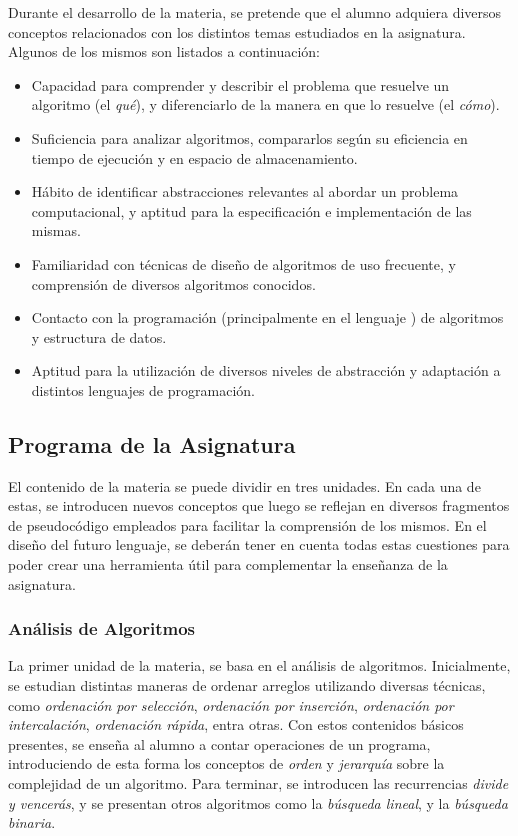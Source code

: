 Durante el desarrollo de la materia, se pretende que el alumno adquiera diversos conceptos relacionados con los distintos temas estudiados en la asignatura.
Algunos de los mismos son listados a continuación:
\begin{itemize}
    \item Capacidad para comprender y describir el problema que resuelve un algoritmo (el \textit{qué}), y diferenciarlo de la manera en que lo resuelve (el \textit{cómo}).
    \item Suficiencia para analizar algoritmos, compararlos según su eficiencia en tiempo de ejecución y en espacio de almacenamiento.
    \item Hábito de identificar abstracciones relevantes al abordar un problema computacional, y aptitud para la especificación e implementación de las mismas.
    \item Familiaridad con técnicas de diseño de algoritmos de uso frecuente, y comprensión de diversos algoritmos conocidos.
    \item Contacto con la programación (principalmente en el lenguaje \C{}) de algoritmos y estructura de datos.
    \item Aptitud para la utilización de diversos niveles de abstracción y adaptación a distintos lenguajes de programación.
\end{itemize}

\subsection{Programa de la Asignatura}

El contenido de la materia se puede dividir en tres unidades.
En cada una de estas, se introducen nuevos conceptos que luego se reflejan en diversos fragmentos de pseudocódigo empleados para facilitar la comprensión de los mismos.
En el diseño del futuro lenguaje, se deberán tener en cuenta todas estas cuestiones para poder crear una herramienta útil para complementar la enseñanza de la asignatura.

\subsubsection{Análisis de Algoritmos}

La primer unidad de la materia, se basa en el análisis de algoritmos.
Inicialmente, se estudian distintas maneras de ordenar arreglos utilizando diversas técnicas, como \textit{ordenación por selección}, \textit{ordenación por inserción}, \textit{ordenación por intercalación}, \textit{ordenación rápida}, entra otras.
Con estos contenidos básicos presentes, se enseña al alumno a contar operaciones de un programa, introduciendo de esta forma los conceptos de \textit{orden} y \textit{jerarquía} sobre la complejidad de un algoritmo.
Para terminar, se introducen las recurrencias \textit{divide y vencerás}, y se presentan otros algoritmos como la \textit{búsqueda lineal}, y la \textit{búsqueda binaria}.

